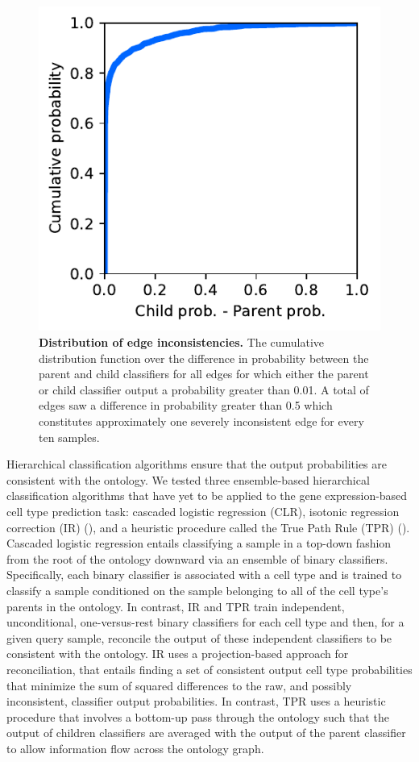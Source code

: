 \begin{figure}[htbp]
    \centerline{\includegraphics[scale=1.0]{figures/CDF_inconsistences.pdf}}
    \caption{\textbf{Distribution of edge inconsistencies.} The cumulative distribution function over the difference in probability between the parent and child classifiers for all edges for which either the parent or child classifier output a probability greater than 0.01.  A total of \EdgesSeverelyInconsistent{} edges saw a difference in probability greater than 0.5 which constitutes approximately one severely inconsistent edge for every ten samples.}
    \label{fig:cdf_incons}
      \end{figure} 

Hierarchical classification algorithms ensure that the output probabilities are consistent with the ontology. We tested three ensemble-based hierarchical classification algorithms that have yet to be applied to the gene expression-based cell type prediction task: cascaded logistic regression (CLR), isotonic regression correction (IR) (\citealp{Obozinski2008}), and a heuristic procedure called the True Path Rule (TPR) (\citealp{Notaro2017}). Cascaded logistic regression entails classifying a sample in a top-down fashion from the root of the ontology downward via an ensemble of binary classifiers. Specifically, each binary classifier is associated with a cell type and is trained to classify a sample conditioned on the sample belonging to all of the cell type's parents in the ontology. In contrast, IR and TPR train independent, unconditional, one-versus-rest binary classifiers for each cell type and then, for a given query sample, reconcile the output of these independent classifiers to be consistent with the ontology. IR uses a projection-based approach for reconciliation, that entails finding a set of consistent output cell type probabilities that minimize the sum of squared differences to the raw, and possibly inconsistent, classifier output probabilities. In contrast, TPR uses a heuristic procedure that involves a bottom-up pass through the ontology such that the output of children classifiers are averaged with the output of the parent classifier to allow information flow across the ontology graph.


